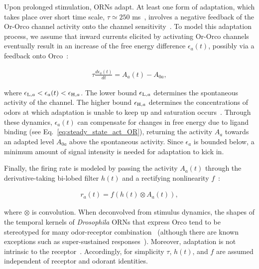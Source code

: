 \documentclass[9pt,lineno]{elife}
\begin{document}
{Upon prolonged stimulation, ORNs adapt. At least one form of adaptation, which takes place over short time scale, $\tau\simeq 250$ ms~\citep{srinivas_elife}, involves a negative feedback of the Or-Orco channel activity onto the channel sensitivity~\citep{nagel_wilson_biophysical,srinivas_elife}. To model this adaptation process, we assume that inward currents elicited by activating Or-Orco channels eventually result in an increase of the free energy difference $\epsilon_a(t)$, possibly via a feedback onto Orco~\citep{orco_structure}:

\begin{align}
\tau\frac{d\epsilon_a(t)}{dt} = {A}_{a}(t) - A_{0a},
\label{eq:adaptation_dynamics}
\end{align}

where $\epsilon_{\textup{L}, a} < \epsilon_a(t) < \epsilon_{\textup{H}, a}$. The lower bound $\epsilon_{\textup{L}, a}$ determines the spontaneous activity of the channel. The higher bound $\epsilon_{\textup{H}, a}$ determines the concentrations of odors at which adaptation is unable to keep up and saturation occurs~\citep{srinivas_elife}. Through these dynamics, $\epsilon_a(t)$ can compensate for changes in free energy due to ligand binding (see Eq.~\ref{eq:steady_state_act_OR}), returning the activity $A_a$ towards an adapted level $A_{0a}$ above the spontaneous activity. Since $\epsilon_a$ is bounded below, a minimum amount of signal intensity is needed for adaptation to kick in. }Finally, the firing rate is modeled by passing the activity $A_a(t)$ through the derivative-taking bi-lobed filter $h(t)$ and a rectifying nonlinearity
$f$~\citep{srinivas_elife}:

\begin{align}
r_a(t)=f\left(h(t) \otimes A_a(t)\right),
\label{eq:firing_machinery}
\end{align}

where $\otimes$ is convolution. When deconvolved from stimulus dynamics, the shapes of the temporal kernels of \textit{Drosophila} ORNs that express Orco tend to be stereotyped for many odor-receptor combination~\citep{martelli,srinivas_elife,si2017invariances} {\color{blue} (although there are known exceptions such as super-sustained responses~\citep{montague2011similar})}. Moreover, adaptation is not intrinsic to the receptor~\citep{nagel_wilson_biophysical}. Accordingly, for simplicity $\tau$, $h(t)$, and $f$ are assumed independent of receptor and odorant identities.
\end{document}
